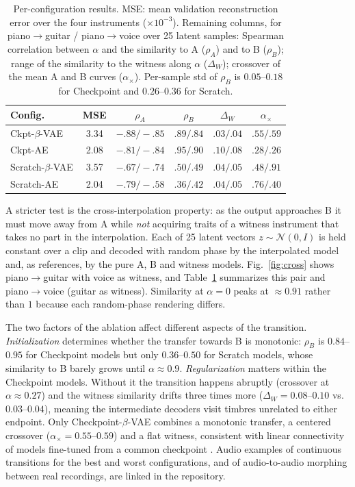 \documentclass{article}
\begin{document}
\begin{table}[t]
\centering
\footnotesize
\setlength{\tabcolsep}{3.5pt}
\begin{tabular}{lccccc}
\hline
Config. & MSE & $\rho_A$ & $\rho_B$ & $\Delta_W$ & $\alpha_\times$ \\
\hline
Ckpt-$\beta$-VAE & 3.34 & $-.88/-.85$ & $.89/.84$ & $.03/.04$ & $.55/.59$ \\
Ckpt-AE          & 2.08 & $-.81/-.84$ & $.95/.90$ & $.10/.08$ & $.28/.26$ \\
Scratch-$\beta$-VAE & 3.57 & $-.67/-.74$ & $.50/.49$ & $.04/.05$ & $.48/.91$ \\
Scratch-AE       & 2.04 & $-.79/-.58$ & $.36/.42$ & $.04/.05$ & $.76/.40$ \\
\hline
\end{tabular}
\caption{Per-configuration results. MSE: mean validation reconstruction error over
the four instruments ($\times10^{-3}$). Remaining columns, for
piano$\rightarrow$guitar / piano$\rightarrow$voice over 25 latent samples:
Spearman correlation between $\alpha$ and the similarity to A ($\rho_A$) and to B
($\rho_B$); range of the similarity to the witness along $\alpha$ ($\Delta_W$);
crossover of the mean A and B curves ($\alpha_\times$). Per-sample std of
$\rho_B$ is $0.05$--$0.18$ for Checkpoint and $0.26$--$0.36$ for Scratch.}
\label{tab:results}
\end{table}

A stricter test is the cross-interpolation property: as the output approaches B
it must move away from A while \emph{not} acquiring traits of a witness
instrument that takes no part in the interpolation. Each of 25 latent vectors
$z\sim\mathcal{N}(0,I)$ is held constant over a clip and decoded with random
phase by the interpolated model and, as references, by the pure A, B and witness
models. Fig.~\ref{fig:cross} shows piano$\rightarrow$guitar with voice as witness,
and Table~\ref{tab:results} summarizes this pair and piano$\rightarrow$voice
(guitar as witness). Similarity at $\alpha=0$ peaks at $\approx0.91$ rather than
$1$ because each random-phase rendering differs.

The two factors of the ablation affect different aspects of the transition.
\emph{Initialization} determines whether the transfer towards B is monotonic:
$\rho_B$ is $0.84$--$0.95$ for Checkpoint models but only $0.36$--$0.50$ for
Scratch models, whose similarity to B barely grows until $\alpha\approx0.9$. \emph{Regularization} matters within the Checkpoint
models. Without it the transition happens abruptly (crossover at
$\alpha\approx0.27$) and the witness similarity drifts three times more
($\Delta_W=0.08$--$0.10$ vs.\ $0.03$--$0.04$), meaning the intermediate decoders
visit timbres unrelated to either endpoint. Only Checkpoint-$\beta$-VAE combines
a monotonic transfer, a centered crossover ($\alpha_\times=0.55$--$0.59$) and a
flat witness, consistent with linear connectivity of models fine-tuned from a
common checkpoint \cite{frankle2020lmc,neyshabur2020transfer}. Audio examples of
continuous transitions for the best and worst configurations, and of
audio-to-audio morphing between real recordings, are linked in the repository.
\end{document}
